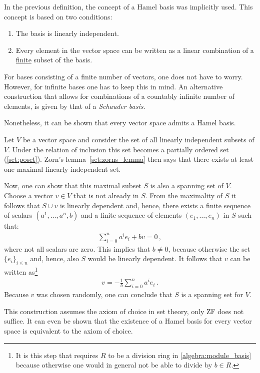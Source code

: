     \begin{remark}\label{linalgebra:hamel_remark}
        In the previous definition, the concept of a Hamel basis was implicitly used. This concept is based on two conditions:
        \begin{enumerate}
            \item The basis is linearly independent.
            \item Every element in the vector space can be written as a linear combination of a \underline{finite} subset of the basis.
        \end{enumerate}
        For bases consisting of a finite number of vectors, one does not have to worry. However, for infinite bases one has to keep this in mind. An alternative construction that allows for combinations of a countably infinite number of elements, is given by that of a \textit{Schauder basis}.
    \end{remark}
    Nonetheless, it can be shown that every vector space admits a Hamel basis.
    \begin{construct}\label{linalgebra:hamel_basis}
        Let $V$ be a vector space and consider the set of all linearly independent subsets of $V$. Under the relation of inclusion this set becomes a partially ordered set (\cref{set:poset}). Zorn's lemma~\ref{set:zorns_lemma} then says that there exists at least one maximal linearly independent set.

        Now, one can show that this maximal subset $S$ is also a spanning set of $V$. Choose a vector $v\in V$ that is not already in $S$. From the maximality of $S$ it follows that $S\cup v$ is linearly dependent and, hence, there exists a finite sequence of scalars $(a^1,\ldots,a^n,b)$ and a finite sequence of elements $(e_1,\ldots,e_n)$ in $S$ such that:
        \begin{gather}
            \sum_{i=0}^n a^ie_i + bv = 0\,,
        \end{gather}
        where not all scalars are zero. This implies that $b\neq0$, because otherwise the set $\{e_i\}_{i\leq n}$ and, hence, also $S$ would be linearly dependent. It follows that $v$ can be written as\footnote{It is this step that requires $R$ to be a division ring in \cref{algebra:module_basis} because otherwise one would in general not be able to divide by $b\in R$.}
        \begin{gather}
            v = -\frac{1}{b}\sum_{i=0}^na^ie_i\,.
        \end{gather}
        Because $v$ was chosen randomly, one can conclude that $S$ is a spanning set for $V$.
    \end{construct}
    \begin{remark*}
        This construction assumes the axiom of choice in set theory, only ZF does not suffice. It can even be shown that the existence of a Hamel basis for every vector space is equivalent to the axiom of choice.
    \end{remark*}

